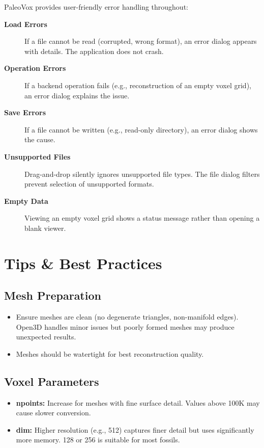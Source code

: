 \documentclass[12pt,a4paper]{article}
\begin{document}
PaleoVox provides user-friendly error handling throughout:

\begin{description}
  \item[\textbf{Load Errors}] If a file cannot be read (corrupted, wrong format), an error dialog appears with details. The application does not crash.
  \item[\textbf{Operation Errors}] If a backend operation fails (e.g., reconstruction of an empty voxel grid), an error dialog explains the issue.
  \item[\textbf{Save Errors}] If a file cannot be written (e.g., read-only directory), an error dialog shows the cause.
  \item[\textbf{Unsupported Files}] Drag-and-drop silently ignores unsupported file types. The file dialog filters prevent selection of unsupported formats.
  \item[\textbf{Empty Data}] Viewing an empty voxel grid shows a status message rather than opening a blank viewer.
\end{description}

\section{Tips \& Best Practices}

\subsection{Mesh Preparation}
\begin{itemize}
  \item Ensure meshes are clean (no degenerate triangles, non-manifold edges). Open3D handles minor issues but poorly formed meshes may produce unexpected results.
  \item Meshes should be watertight for best reconstruction quality.
\end{itemize}

\subsection{Voxel Parameters}
\begin{itemize}
  \item \textbf{npoints:} Increase for meshes with fine surface detail. Values above 100K may cause slower conversion.
  \item \textbf{dim:} Higher resolution (e.g., 512) captures finer detail but uses significantly more memory. 128 or 256 is suitable for most fossils.
\end{itemize}
\end{document}
